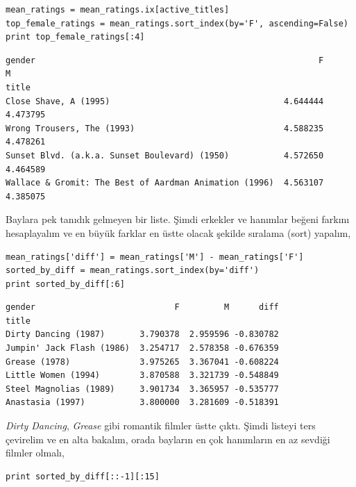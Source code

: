 \documentclass[12pt,fleqn]{article}\usepackage{../../common}
\begin{document}
\begin{verbatim}
mean_ratings = mean_ratings.ix[active_titles]
top_female_ratings = mean_ratings.sort_index(by='F', ascending=False)
print top_female_ratings[:4]
\end{verbatim}

\begin{verbatim}
gender                                                         F         M
title                                                                     
Close Shave, A (1995)                                   4.644444  4.473795
Wrong Trousers, The (1993)                              4.588235  4.478261
Sunset Blvd. (a.k.a. Sunset Boulevard) (1950)           4.572650  4.464589
Wallace & Gromit: The Best of Aardman Animation (1996)  4.563107  4.385075
\end{verbatim}

Baylara pek tanıdık gelmeyen bir liste. Şimdi erkekler ve hanımlar
beğeni farkını hesaplayalım ve en büyük farklar en üstte olacak
şekilde sıralama (sort) yapalım,

\begin{verbatim}
mean_ratings['diff'] = mean_ratings['M'] - mean_ratings['F']
sorted_by_diff = mean_ratings.sort_index(by='diff')
print sorted_by_diff[:6] 
\end{verbatim}

\begin{verbatim}
gender                            F         M      diff
title                                                  
Dirty Dancing (1987)       3.790378  2.959596 -0.830782
Jumpin' Jack Flash (1986)  3.254717  2.578358 -0.676359
Grease (1978)              3.975265  3.367041 -0.608224
Little Women (1994)        3.870588  3.321739 -0.548849
Steel Magnolias (1989)     3.901734  3.365957 -0.535777
Anastasia (1997)           3.800000  3.281609 -0.518391
\end{verbatim}

{\em Dirty Dancing}, {\em Grease} gibi romantik filmler üstte çıktı. Şimdi
listeyi ters çevirelim ve en alta bakalım, orada bayların en çok
hanımların en az sevdiği filmler olmalı,

\begin{verbatim}
print sorted_by_diff[::-1][:15]
\end{verbatim}
\end{document}

